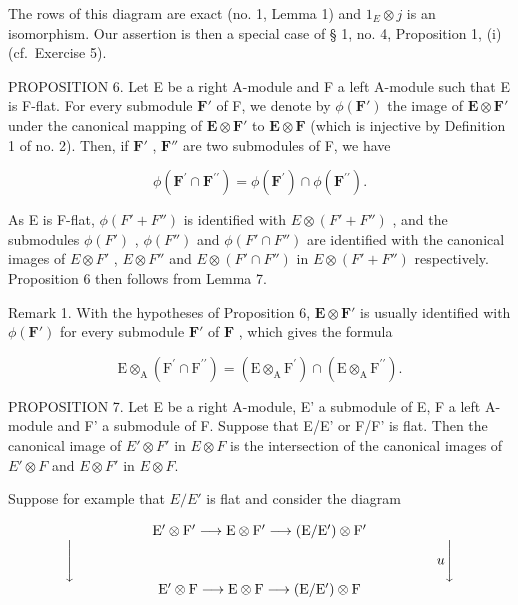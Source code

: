 The rows of this diagram are exact (no. 1, Lemma 1) and \(1_{E} \otimes j\) is an isomorphism. Our assertion is then a special case of § 1, no. 4, Proposition 1, (i) (cf.~Exercise 5).

PROPOSITION 6. Let E be a right A-module and F a left A-module such that E is F-flat. For every submodule \(\mathbf{F}'\) of F, we denote by \(\phi(\mathbf{F}')\) the image of \(\mathbf{E} \otimes \mathbf{F}'\) under the canonical mapping of \(\mathbf{E} \otimes \mathbf{F}'\) to \(\mathbf{E} \otimes \mathbf{F}\) (which is injective by Definition 1 of no. 2). Then, if \(\mathbf{F}'\) , \(\mathbf{F}''\) are two submodules of F, we have

\[
\phi (\mathbf {F} ^ {\prime} \cap \mathbf {F} ^ {\prime \prime}) = \phi (\mathbf {F} ^ {\prime}) \cap \phi (\mathbf {F} ^ {\prime \prime}).
\]

As E is F-flat, \(\phi(F' + F'')\) is identified with \(E \otimes (F' + F'')\) , and the submodules \(\phi(F')\) , \(\phi(F'')\) and \(\phi(F' \cap F'')\) are identified with the canonical images of \(E \otimes F'\) , \(E \otimes F''\) and \(E \otimes (F' \cap F'')\) in \(E \otimes (F' + F'')\) respectively. Proposition 6 then follows from Lemma 7.

Remark 1. With the hypotheses of Proposition 6, \(\mathbf{E} \otimes \mathbf{F}'\) is usually identified with \(\phi(\mathbf{F}')\) for every submodule \(\mathbf{F}'\) of \(\mathbf{F}\) , which gives the formula

\[
\mathrm{E} \otimes_ {\mathrm{A}} (\mathrm{F} ^ {\prime} \cap \mathrm{F} ^ {\prime \prime}) = (\mathrm{E} \otimes_ {\mathrm{A}} \mathrm{F} ^ {\prime}) \cap (\mathrm{E} \otimes_ {\mathrm{A}} \mathrm{F} ^ {\prime \prime}).
\]

PROPOSITION 7. Let E be a right A-module, E' a submodule of E, F a left A-module and F' a submodule of F. Suppose that E/E' or F/F' is flat. Then the canonical image of \(E' \otimes F'\) in \(E \otimes F\) is the intersection of the canonical images of \(E' \otimes F\) and \(E \otimes F'\) in \(E \otimes F\).

Suppose for example that \(E/E'\) is flat and consider the diagram

\[
\begin{array}{c} \mathrm{E} ^ {\prime} \otimes \mathrm{F} ^ {\prime} \longrightarrow \mathrm{E} \otimes \mathrm{F} ^ {\prime} \longrightarrow (\mathrm{E} / \mathrm{E} ^ {\prime}) \otimes \mathrm{F} ^ {\prime} \\ \Biggl \downarrow \qquad \qquad \qquad \qquad \qquad \qquad \qquad \qquad \qquad \qquad \qquad \qquad \qquad u \Biggl \downarrow \\ \mathrm{E} ^ {\prime} \otimes \mathrm{F} \longrightarrow \mathrm{E} \otimes \mathrm{F} \longrightarrow (\mathrm{E} / \mathrm{E} ^ {\prime}) \otimes \mathrm{F} \end{array}
\]

